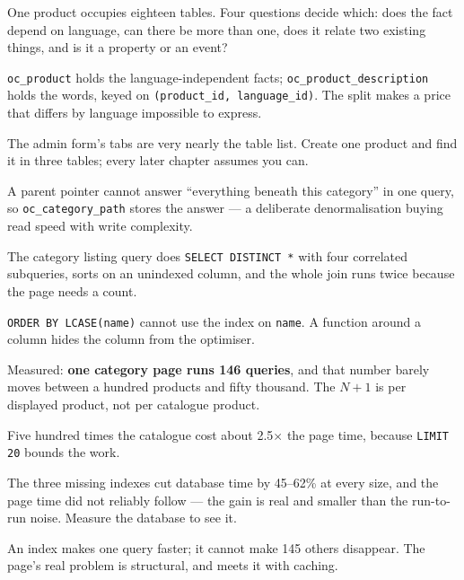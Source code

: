\begin{chaptersummary}
\begin{tight}
  \item One product occupies eighteen tables. Four questions decide which:
        does the fact depend on language, can there be more than one, does it
        relate two existing things, and is it a property or an event?
  \item \texttt{oc\_product} holds the language-independent facts;
        \texttt{oc\_product\_description} holds the words, keyed on
        \texttt{(product\_id, language\_id)}. The split makes a price that
        differs by language impossible to express.
  \item The admin form's tabs are very nearly the table list. Create one
        product and find it in three tables; every later chapter assumes you
        can.
  \item A parent pointer cannot answer ``everything beneath this category''
        in one query, so \texttt{oc\_category\_path} stores the answer --- a
        deliberate denormalisation buying read speed with write complexity.
  \item The category listing query does \texttt{SELECT DISTINCT *} with four
        correlated subqueries, sorts on an unindexed column, and the whole join
        runs twice because the page needs a count.
  \item \texttt{ORDER BY LCASE(name)} cannot use the index on \texttt{name}.
        A function around a column hides the column from the optimiser.
  \item Measured: \textbf{one category page runs 146 queries}, and that number
        barely moves between a hundred products and fifty thousand. The $N+1$
        is per displayed product, not per catalogue product.
  \item Five hundred times the catalogue cost about 2.5$\times$ the page time,
        because \texttt{LIMIT 20} bounds the work.
  \item The three missing indexes cut database time by 45--62\% at every size,
        and the page time did not reliably follow --- the gain is real and
        smaller than the run-to-run noise. Measure the database to see it.
  \item An index makes one query faster; it cannot make 145 others disappear.
        The page's real problem is structural, and  meets it with
        caching.
\end{tight}
\end{chaptersummary}

